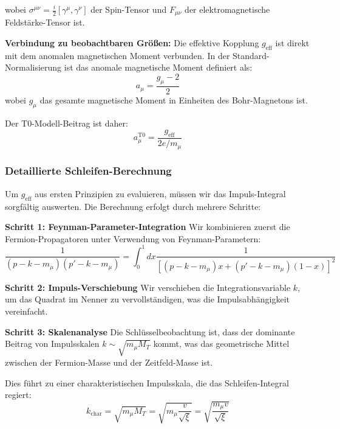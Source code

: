 \documentclass[12pt,a4paper]{article}
\newcommand{\xipar}{\xi}
\begin{document}
	wobei $\sigma^{\mu\nu} = \frac{i}{2}[\gamma^{\mu}, \gamma^{\nu}]$ der Spin-Tensor und $F_{\mu\nu}$ der elektromagnetische Feldstärke-Tensor ist.
	
	\textbf{Verbindung zu beobachtbaren Größen:} Die effektive Kopplung $g_{\text{eff}}$ ist direkt mit dem anomalen magnetischen Moment verbunden. In der Standard-Normalisierung ist das anomale magnetische Moment definiert als:
	\begin{equation}
		a_{\mu} = \frac{g_{\mu} - 2}{2}
	\end{equation}
	wobei $g_{\mu}$ das gesamte magnetische Moment in Einheiten des Bohr-Magnetons ist.
	
	Der T0-Modell-Beitrag ist daher:
	\begin{equation}
		a_{\mu}^{\text{T0}} = \frac{g_{\text{eff}}}{2e/m_{\mu}}
	\end{equation}
	
	\subsubsection{Detaillierte Schleifen-Berechnung}
	
	Um $g_{\text{eff}}$ aus ersten Prinzipien zu evaluieren, müssen wir das Impuls-Integral sorgfältig auswerten. Die Berechnung erfolgt durch mehrere Schritte:
	
	\textbf{Schritt 1: Feynman-Parameter-Integration}
	Wir kombinieren zuerst die Fermion-Propagatoren unter Verwendung von Feynman-Parametern:
	\begin{equation}
		\frac{1}{(p-k-m_{\mu})(p'-k-m_{\mu})} = \int_0^1 dx \frac{1}{[(p-k-m_{\mu})x + (p'-k-m_{\mu})(1-x)]^2}
	\end{equation}
	
	\textbf{Schritt 2: Impuls-Verschiebung}
	Wir verschieben die Integrationsvariable $k$, um das Quadrat im Nenner zu vervollständigen, was die Impulsabhängigkeit vereinfacht.
	
	\textbf{Schritt 3: Skalenanalyse}
	Die Schlüsselbeobachtung ist, dass der dominante Beitrag von Impulsskalen $k \sim \sqrt{m_{\mu} M_T}$ kommt, was das geometrische Mittel zwischen der Fermion-Masse und der Zeitfeld-Masse ist.
	
	Dies führt zu einer charakteristischen Impulsskala, die das Schleifen-Integral regiert:
	\begin{equation}
		k_{\text{char}} = \sqrt{m_{\mu} M_T} = \sqrt{m_{\mu} \frac{v}{\sqrt{\xipar}}} = \sqrt{\frac{m_{\mu} v}{\sqrt{\xipar}}}
	\end{equation}
	
\end{document}
